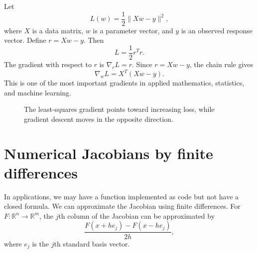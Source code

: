 \documentclass[11pt]{article}
\newcommand{\R}{\mathbb R}
\newcommand{\grad}{\nabla}
\begin{document}
\begin{workedexample}
Let
\[
L(w)=\frac12\|Xw-y\|^2,
\]
where $X$ is a data matrix, $w$ is a parameter vector, and $y$ is an observed response vector. Define $r=Xw-y$. Then
\[
L=\frac12 r^Tr.
\]
The gradient with respect to $r$ is $\grad_r L=r$. Since $r=Xw-y$, the chain rule gives
\[
\boxed{\grad_w L=X^T(Xw-y)}.
\]
This is one of the most important gradients in applied mathematics, statistics, and machine learning.
\end{workedexample}

\begin{figure}[H]
\centering
{}
\caption{The least-squares gradient points toward increasing loss, while gradient descent moves in the opposite direction.}
\end{figure}

\section{Numerical Jacobians by finite differences}

In applications, we may have a function implemented as code but not have a closed formula. We can approximate the Jacobian using finite differences. For $F:\R^n\to\R^m$, the $j$th column of the Jacobian can be approximated by
\[
\frac{F(x+he_j)-F(x-he_j)}{2h},
\]
where $e_j$ is the $j$th standard basis vector.
\end{document}
